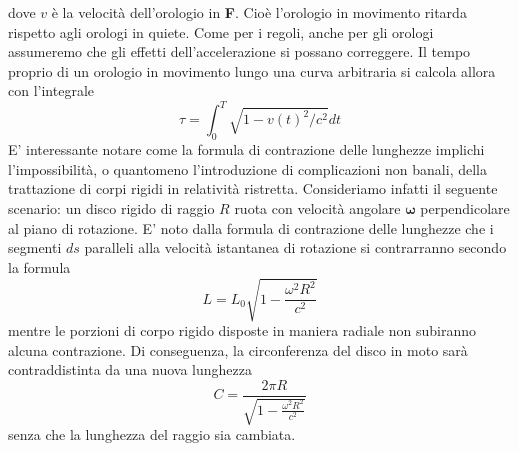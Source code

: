 \documentclass[a4paper,11pt]{book}
\theoremstyle{plain}
\theoremstyle{definition}
\begin{document}
dove $v$ è la velocità dell'orologio in \textbf{F}. Cioè l'orologio in movimento ritarda rispetto agli orologi in quiete. Come per i regoli, anche per gli orologi assumeremo che gli effetti dell’accelerazione si possano correggere. Il tempo proprio di un orologio in movimento lungo una curva arbitraria si calcola allora con l’integrale
\[
\tau = \int_0^T \sqrt{1-v(t)^2/c^2}dt
\]
E' interessante notare come la formula di contrazione delle lunghezze implichi l'impossibilità, o quantomeno l'introduzione di complicazioni non banali, della trattazione di corpi rigidi in relatività ristretta. Consideriamo infatti il seguente scenario: un disco rigido di raggio $R$ ruota con velocità angolare $\boldsymbol{\omega}$ perpendicolare al piano di rotazione. E' noto dalla formula di contrazione delle lunghezze che i segmenti $ds$ paralleli alla velocità istantanea di rotazione si contrarranno secondo la formula
\[
L=L_0 \sqrt{1-\frac{\omega^2R^2}{c^2}}
\]
mentre le porzioni di corpo rigido disposte in maniera radiale non subiranno alcuna contrazione. Di conseguenza, la circonferenza del disco in moto sarà contraddistinta da una nuova lunghezza
\[
C=\frac{2\pi R}{\sqrt{1-\frac{\omega^2R^2}{c^2}}}
\]
senza che la lunghezza del raggio sia cambiata.
\end{document}
